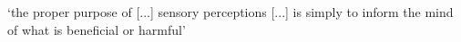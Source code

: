 \documentclass[12pt]{extarticle}
\begin{document}
\begin{multicols*}{3}
‘the proper purpose of [...] sensory perceptions [...] is simply to inform the mind of what is beneficial or harmful’ 
\citep[pp.~57-8]{descartes:1985_csm2}
 











\footnotesize


\end{multicols*}
\end{document}
